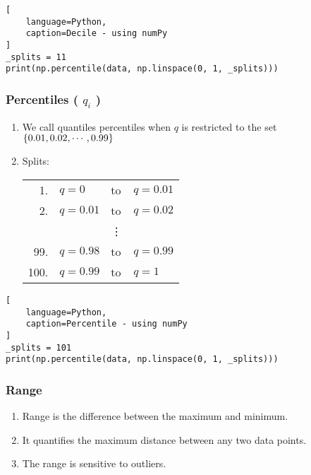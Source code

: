 \begin{lstlisting}[
    language=Python, 
    caption=Decile - using numPy
]
_splits = 11
print(np.percentile(data, np.linspace(0, 1, _splits)))
\end{lstlisting}


\subsubsection{Percentiles ( $q_i$ ) \cite{statistics/book/Statistics-for-Data-Scientists/Maurits-Kaptein}} \label{Data/Describing Data/Central Tendency/Percentiles}

\begin{enumerate}
    \item We call quantiles percentiles when $q$ is restricted to the set $\left\{0.01, 0.02,\cdots, 0.99\right\}$ \hfill \cite{statistics/book/Statistics-for-Data-Scientists/Maurits-Kaptein}

    \item Splits: \\
    \begin{tabular}{r l l l} %
        1. & $q = 0$ & to & $q = 0.01$ \\
        2. & $q = 0.01$ & to & $q = 0.02$ \\
        & & \vdots & \\
        99. & $q = 0.98$ & to & $q = 0.99$ \\
        100. & $q = 0.99$ & to & $q = 1$ \\
    \end{tabular}
\end{enumerate}


\begin{lstlisting}[
    language=Python, 
    caption=Percentile - using numPy
]
_splits = 101
print(np.percentile(data, np.linspace(0, 1, _splits)))
\end{lstlisting}


\subsubsection{Range \cite{statistics/book/Statistics-for-Data-Scientists/Maurits-Kaptein}} \label{Data/Describing Data/Central Tendency/Range}

\begin{enumerate}
    \item Range is the difference between the maximum and minimum. \hfill \cite{statistics/book/Statistics-for-Data-Scientists/Maurits-Kaptein}
    
    \item It quantifies the maximum distance between any two data points. \hfill \cite{statistics/book/Statistics-for-Data-Scientists/Maurits-Kaptein}

    \item The range is sensitive to outliers. \hfill \cite{statistics/book/Statistics-for-Data-Scientists/Maurits-Kaptein}
\end{enumerate}


